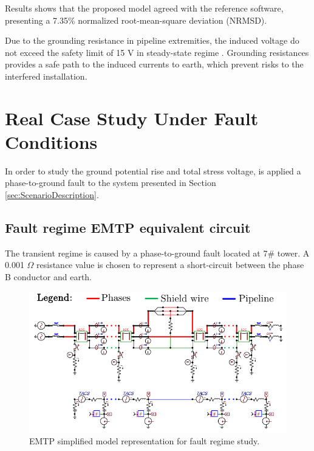 \documentclass{IEEEtran4PSCC}
\begin{document}
Results shows that the proposed model agreed with the reference software, presenting a 7.35\% normalized root-mean-square deviation (NRMSD).

Due to the grounding resistance in pipeline extremities, the induced voltage do not exceed the safety limit of 15 V in steady-state regime \cite{NACEInternational2007}. Grounding resistances provides a safe path to the induced currents to earth, which prevent risks to the interfered installation. 

\section{Real Case Study Under Fault Conditions}

In order to study the ground potential rise and total stress voltage, is applied a phase-to-ground fault to the system presented in Section \ref{sec:ScenarioDescription}.

\subsection{Fault regime EMTP equivalent circuit}

The transient regime is caused by a phase-to-ground fault located at 7\# tower. A 0.001 $\Omega$ resistance value is chosen to represent a short-circuit between the phase B conductor and earth.

\begin{figure}[hbt]
	\begin{center}
		\includegraphics[width=1\columnwidth]{./fig/Fault_circuit.pdf}
		\caption{EMTP simplified model representation for fault regime study.}
		\label{fig:FaultCircuit}
	\end{center}
\end{figure}
\end{document}
